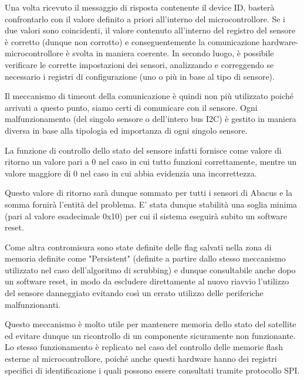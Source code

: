 \documentclass[LaM,binding=0.6cm]{../sapthesis}
\begin{document}
Una volta ricevuto il messaggio di risposta contenente il device ID, basterà confrontarlo con il valore definito a priori all’interno del microcontrollore. Se i due valori sono coincidenti, il valore contenuto all’interno del registro del sensore è corretto (dunque non corrotto) e conseguentemente la comunicazione hardware-microcontrollore è svolta in maniera coerente. In secondo luogo, è possibile verificare le corrette impostazioni dei sensori, analizzando e correggendo se necessario i registri di configurazione (uno o più in base al tipo di sensore). 

Il meccanismo di timeout della comunicazione è quindi non più utilizzato poiché arrivati a questo punto, siamo certi di comunicare con il sensore.
Ogni malfunzionamento (del singolo sensore o dell'intero bus I2C) è gestito in maniera diversa in base alla tipologia ed importanza di ogni singolo sensore.

La funzione di controllo dello stato del sensore infatti fornisce come valore di ritorno un valore pari a 0 nel caso in cui tutto funzioni correttamente, mentre un valore maggiore di 0 nel caso in cui abbia evidenzia una incorrettezza.

Questo valore di ritorno sarà dunque sommato per tutti i sensori di Abacus e la somma fornirà l'entità del problema. E' stata dunque stabilità una soglia minima (pari al valore esadecimale 0x10) per cui il sistema eseguirà subito un software reset.

Come altra contromisura sono state definite delle flag salvati nella zona di memoria definite come "Persistent" (definite a partire dallo stesso meccanismo utilizzato nel caso dell'algoritmo di scrubbing) e dunque consultabile anche dopo un software reset, in modo da escludere direttamente al nuovo riavvio l'utilizzo del sensore danneggiato evitando così un errato utilizzo delle periferiche malfunzionanti. 

Questo  meccanismo è molto utile per mantenere memoria dello stato del satellite ed evitare dunque un ricontrollo di un componente sicuramente non funzionante.
\newline\newline
Lo stesso funzionamento è replicato nel caso del controllo delle memorie flash esterne al microcontrollore, poiché anche questi hardware hanno dei registri specifici di identificazione i quali possono essere consultati tramite protocollo SPI.
\end{document}
